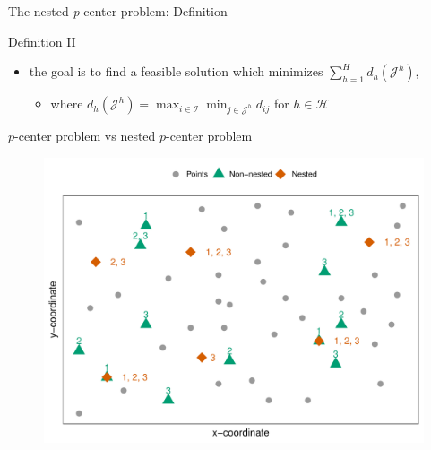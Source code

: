 \documentclass[utf8,aspectratio=169,ngerman,english]{beamer}
\begin{document}
\begin{frame}{The nested \textit{p}-center problem: Definition}
\begin{minipage}{0.48\textwidth}
\begin{block}{Definition II}
\begin{itemize}
                \begin{itemize}
                    \item with $\left\lvert \mathcal J^h \right\rvert = p^h$ for $h \in \mathcal H$,
                    \item for which $\mathcal J^h \subseteq \mathcal J^{h+1}$ for $h = 1, \dots, H-1$ holds \pause
                \end{itemize} 
                \item the goal is to find a feasible solution which minimizes $\sum_{h = 1}^{H} d_h(\mathcal J^h)$, 
                \begin{itemize}
                    \item where $d_h(\mathcal J^h) = \max_{i \in \mathcal I}\min_{j \in \mathcal J^h} d_{ij}$ for $h \in \mathcal H$
                \end{itemize}
            \end{itemize}
            \vspace*{3pt}
        \end{block}
    \end{minipage}
\end{frame}

\begin{frame}{$p$-center problem vs nested $p$-center problem}
    \centering
    \begin{figure}
        \includegraphics[width=0.55\linewidth]{images/Rplot01.pdf}
    \end{figure}
\end{frame}
\end{document}
